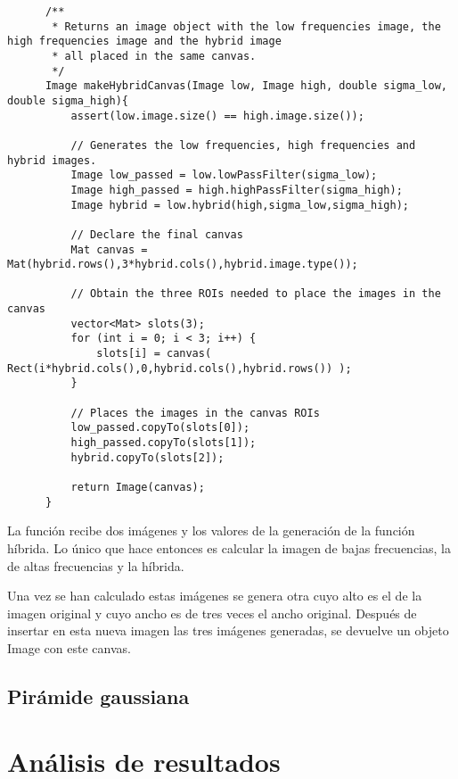 \documentclass[a4paper, 11pt]{article}
\theoremstyle{definition}
\theoremstyle{theorem}
\begin{document}
  \begin{lstlisting}
      /**
       * Returns an image object with the low frequencies image, the high frequencies image and the hybrid image
       * all placed in the same canvas.
       */
      Image makeHybridCanvas(Image low, Image high, double sigma_low, double sigma_high){
          assert(low.image.size() == high.image.size());

          // Generates the low frequencies, high frequencies and hybrid images.
          Image low_passed = low.lowPassFilter(sigma_low);
          Image high_passed = high.highPassFilter(sigma_high);
          Image hybrid = low.hybrid(high,sigma_low,sigma_high);

          // Declare the final canvas
          Mat canvas = Mat(hybrid.rows(),3*hybrid.cols(),hybrid.image.type());

          // Obtain the three ROIs needed to place the images in the canvas
          vector<Mat> slots(3);
          for (int i = 0; i < 3; i++) {
              slots[i] = canvas( Rect(i*hybrid.cols(),0,hybrid.cols(),hybrid.rows()) );
          }

          // Places the images in the canvas ROIs
          low_passed.copyTo(slots[0]);
          high_passed.copyTo(slots[1]);
          hybrid.copyTo(slots[2]);

          return Image(canvas);
      }
  \end{lstlisting}

  La función recibe dos imágenes y los valores de la generación de la función híbrida. Lo único que hace entonces es calcular la imagen de bajas frecuencias, la de altas frecuencias y la híbrida.

  Una vez se han calculado estas imágenes se genera otra cuyo alto es el de la imagen original y cuyo ancho es de tres veces el ancho original. Después de insertar en esta nueva imagen las tres imágenes generadas, se devuelve un objeto Image con este canvas.

  \subsection{Pirámide gaussiana}

  \section{Análisis de resultados}
\end{document}
